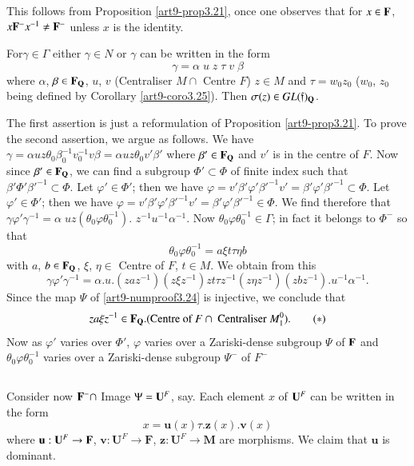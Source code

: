 This follows from Proposition \ref{art9-prop3.21}, once one observes that for $x \in \mathbf{F}$, $x \mathbf{F}^-x^{-1} \neq \mathbf{F}^-$ unless $x$ is the identity.

\begin{proposition}\label{art9-prop3.26}
For\pageoriginale $\gamma \in\Gamma$ either $\gamma \in N$ or $\gamma$ can be written in the form 
$$
\gamma = \alpha \;u \;z \;\tau \;v \;\beta
$$
where $\alpha$, $\beta \in \mathbf{F}_{\mathbf{Q}}$, $u$, $v$ (Centraliser $M \cap $ Centre $F$) $z \in M$ and  $\tau = w_0 z_0$ ($w_0$, $z_0$ being defined by Corollary \ref{art9-coro3.25}). Then $\sigma (z) \in G L (\mathfrak{f})_{\mathbf{Q}}$.
\end{proposition}

The first assertion is just a reformulation of Proposition \ref{art9-prop3.21}. To prove the second assertion, we argue as follows. We have $\gamma = \alpha u z \theta_0 \beta_0^{-1} v^{-1}_0 v \beta = \alpha u z \theta_0 v' \beta'$ where $\beta' \in \mathbf{F}_{\mathbf{Q}}$ and $v'$ is in the centre of $F$. Now since $\beta' \in \mathbf{F}_{\mathbf{Q}}$, we can find a subgroup $\Phi' \subset \Phi$ of finite index such that $\beta' \Phi' \beta'^{-1} \subset \Phi$. Let $\varphi' \in \Phi'$; then we have $\varphi = v' \beta' \varphi' \beta'^{-1} v' = \beta' \varphi' \beta'^{-1} \subset \Phi$. Let $\varphi' \in \Phi'$; then we have $\varphi = v' \beta' \varphi' \beta'^{-1} v' = \beta' \varphi' \beta'^{-1} \in \Phi$. We find therefore that $\gamma \varphi' \gamma^{-1} = \alpha \; u z (\theta_0 \varphi \theta^{-1}_0)$. $z^{-1} u^{-1} \alpha^{-1}$. Now $\theta_0 \varphi \theta^{-1}_0 \in \Gamma$; in fact it belongs to $\Phi^-$ so that 
$$
\theta_0 \varphi \theta^{-1}_0 = a \xi t \tau \eta b
$$
with $a$, $b \in \mathbf{F}_{\mathbf{Q}}$, $\xi$, $\eta \in $ Centre of $F$, $t \in M$. We obtain from this 
$$
\gamma \varphi' \gamma^{-1} = \alpha . u. (z a z^{-1}) (z \xi z^{-1}) z t \tau z^{-1} (z \eta z^{-1}) (z b z^{-1}). u^{-1} \alpha^{-1}.
$$ 
Since the map $\Psi$ of \ref{art9-numproof3.24} is injective, we conclude that
\begin{equation*}
za \xi z^{-1} \in \mathbf{F}_{\mathbf{Q}} . (\text{Centre of } F \cap \text{ Centraliser } M^0_1).\tag*{($\ast$)}
\end{equation*}
Now as $\varphi'$ varies over $\Phi'$, $\varphi$ varies over a Zariski-dense subgroup $\Psi$ of $\mathbf{F}$ and $\theta_0 \varphi \theta^{-1}_0$ varies over a Zariski-dense subgroup $\Psi^-$ of $F^-$ 

\setcounter{subsection}{26}
\subsection{}\label{art9-subsec3.27}
Consider now $\mathbf{F}^- \cap$ Image $\Psi = \mathbf{U}^F$, say. Each element $x$ of $\mathbf{U}^F$ can be written in the form
$$
x = \textbf{u} (x) \tau. \textbf{z} (x). \textbf{v} (x)
$$
where $\textbf{u}: \mathbf{U}^F \to \mathbf{F}$, $\textbf{v}: \textbf{U}^F \to \textbf{F}$, $\textbf{z}: \textbf{U}^F \to \textbf{M}$ are morphisms. We claim that $\textbf{u}$ is dominant.

